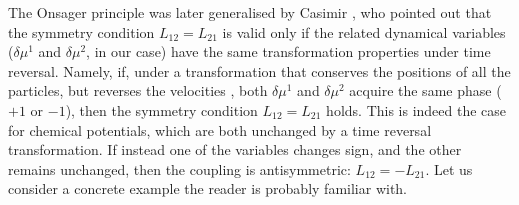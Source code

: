 \documentclass[a4paper, amsfonts, amssymb, amsmath, reprint, showkeys, nofootinbib, twoside, onecolumn,notitlepage]{revtex4-1}
\begin{document}
The Onsager principle was later generalised by Casimir \cite{Onsager_Casimir}, who pointed out that the symmetry condition $L_{12}=L_{21}$ is valid only if the related dynamical variables ($\delta \mu^1$ and $\delta \mu^2$, in our case) have the same transformation properties under time reversal. Namely, if, under a transformation that conserves the positions of all the particles, but reverses the velocities \cite{Pavelka2014}, both $\delta \mu^1$ and $\delta \mu^2$ acquire the same phase ($+1$ or $-1$), then the symmetry condition $L_{12}=L_{21}$ holds. This is indeed the case for chemical potentials, which are both unchanged by a time reversal transformation. If instead one of the variables changes sign, and the other remains unchanged, then the coupling is antisymmetric: $L_{12}=-L_{21}$. Let us consider a concrete example the reader is probably familiar with.
\end{document}
